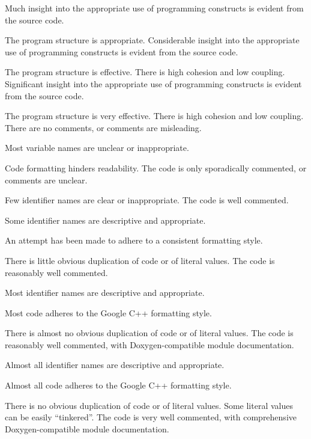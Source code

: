 \documentclass{../fal_assignment}
\begin{document}
\begin{markingrubric}
        \grade Much insight into the appropriate use of programming constructs is evident from the source code.
            \par The program structure is appropriate.
        \grade Considerable insight into the appropriate use of programming constructs is evident from the source code.
            \par The program structure is effective. There is high cohesion and low coupling.
        \grade Significant insight into the appropriate use of programming constructs is evident from the source code.
            \par The program structure is very effective. There is high cohesion and low coupling.
%
        \grade\fail There are no comments, or comments are misleading.
            \par Most variable names are unclear or inappropriate.
            \par Code formatting hinders readability.
        \grade The code is only sporadically commented, or comments are unclear.
            \par Few identifier names are clear or inappropriate.
        \grade The code is well commented.
            \par Some identifier names are descriptive and appropriate.
            \par An attempt has been made to adhere to a consistent formatting style.
             \par There is little obvious duplication of code or of literal values.           
        \grade The code is reasonably well commented.
            \par Most identifier names are descriptive and appropriate.
            \par Most code adheres to the Google C++ formatting style.
             \par There is almost no obvious duplication of code or of literal values.   
        \grade The code is reasonably well commented, with Doxygen-compatible module documentation.
            \par Almost all identifier names are descriptive and appropriate.
            \par Almost all code adheres to the Google C++ formatting style.
             \par There is no obvious duplication of code or of literal values. Some literal values can be easily ``tinkered''. 
        \grade The code is very well commented, with comprehensive Doxygen-compatible module documentation.

\end{markingrubric}
\end{document}
